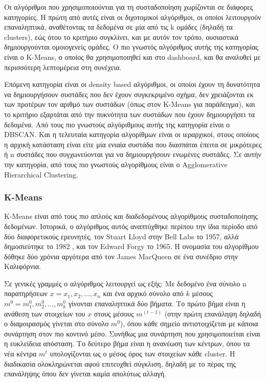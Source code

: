 \documentclass[greek, 12pt]{article}
\begin{document}
Οι αλγόριθμοι που χρησιμοποιούνται για τη συσταδοποίηση χωρίζονται σε διάφορες κατηγορίες. Η πρώτη από αυτές είναι οι διχοτομικοί αλγόριθμοι, οι οποίοι λειτουργούν επαναληπτικά, αναθέτοντας τα δεδομένα σε μία από τις k ομάδες (δηλαδή τα clusters), εώς ότου το κριτήριο συγκλίνει, και με αυτόν τον τρόπο, ουσιαστικά δημιουργούνται ομοιογενείς ομάδες. \cite{sen2020supervised} Ο πιο γνωστός αλγόριθμος αυτής της κατηγορίας είναι ο K-Means, ο οποίος θα χρησιμοποιηθεί και στο dashboard, και θα αναλυθεί με περισσότερη λεπτομέρεια στη συνέχεια.

Επόμενη κατηγορία είναι οι density based αλγόριθμοι, οι οποίοι έχουν τη δυνατότητα να δημιουργήσουν συστάδες που δεν έχουν συγκεκριμένο σχήμα, δεν χρειάζονται εκ των προτέρων τον αριθμό των συστάδων (όπως στον K-Means για παράδειγμα), και το κριτήριο εξαρτάται από την πυκνότητα των συστάδων που έχουν δημιουργήσει τα δεδομένα. Από τους πιο γνωστούς αλγόριθμους αυτής της κατηγορία είναι ο DBSCAN. Και η τελευταία κατηγορία αλγορίθμων είναι οι ιεραρχικοί, στους οποίους η αρχική κατάσταση είναι είτε μία ενιαία συστάδα που διασπάται έπειτα σε μικρότερες ή n συστάδες που συγχωνεύονται για να δημιουργήσουν ενωμένες συστάδες. Σε αυτήν την κατηγορία, από τους πιο γνωστούς αλγορίθμους είναι ο Agglomerative Hierarchical Clustering. \cite{sen2020supervised}

\subsubsection{K-Means}

 K-Means είναι από τους πιο απλούς και διαδεδομένους αλγορίθμους συσταδοποίησης δεδομένων. Ιστορικά, ο αλγόριθμος αυτός αναπτύχθηκε περίπου την ίδια περίοδο από δύο διαφορετικούς ερευνητές, τον Stuart Lloyd στην Bell Labs το 1957, αλλά δημοσιεύτηκε το 1982 \cite{lloyd1982least}, και τον Edward Forgy το 1965. \cite{forgy1965cluster} Η ονομασία του αλγορίθμου δόθηκε δύο χρόνια αργότερα από τον James MacQueen σε ένα συνέδριο στην Καλιφόρνια. \cite{macqueen1967some}

Σε γενικές γραμμές ο αλγόριθμος λειτουργεί ως εξής: Με δεδομένο ένα σύνολο n παρατηρήσεων $x={x_1,x_2,…,x_n}$ και ένα αρχικό σύνολο από $k$ μέσους $m^0={m_1^0,m_2^0,…,m_k^0}$ γίνονται επαναληπτικά δύο βήματα. Το πρώτο βήμα είναι η ανάθεση των στοιχείων του $x$ στους μέσους $m^{(t-1)}$ (στην πρώτη επανάληψη δηλαδή ο διαμοιρασμός γίνεται στο σύνολο $m^0$), όπου κάθε σημείο αντιστοιχίζεται με κάποια συνάρτηση στον πιο κοντινό μέσο. Συνήθως μια συνάρτηση που χρησιμοποιείται είναι η ευκλείδεια απόσταση. Το δεύτερο βήμα είναι η ανανέωση των κέντρων, όπου τα νέα κέντρα $m^t$ υπολογίζονται ως ο μέσος όρος των στοιχείων κάθε cluster. Η διαδικασία ολοκληρώνεται αφού επιτευχθεί σύγκλιση, δηλαδή με το πέρας της επανάληψης όπου δεν γίνεται καμία απολύτως αλλαγή.
\end{document}

